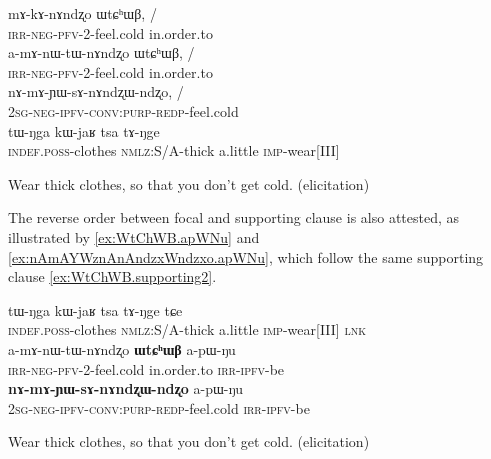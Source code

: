 \documentclass[oldfontcommands,oneside,a4paper,11pt]{article}
\newcommand{\ipa}[1]{{\phon \mbox{#1}}} %
\begin{document}
 \begin{exe}
\ex \label{ex:WtChWB}  \begin{xlist}
\ex
 \gll 
\ipa{mɤ-kɤ-nɤndʐo} 	\ipa{ɯtɕʰɯβ,} 	/\\
 \textsc{irr-neg-pfv}-2-feel.cold in.order.to\\
 \ex
 \gll 
\ipa{a-mɤ-nɯ-tɯ-nɤndʐo} 	\ipa{ɯtɕʰɯβ,} / \\
 \textsc{irr-neg-pfv}-2-feel.cold in.order.to\\
 \ex \label{ex:nAmAsAnAndzxWndzxo}  
 \gll 
 \ipa{nɤ-mɤ-ɲɯ-sɤ-nɤndʐɯ-ndʐo,} /\\
 \textsc{2sg-neg-ipfv-conv:purp-redp}-feel.cold\\
 \ex  \label{ex:WtChWB.supporting}  
 \gll 
 \ipa{tɯ-ŋga}    	\ipa{kɯ-jaʁ}    	\ipa{tsa}    	\ipa{tɤ-ŋge}  \\
 \textsc{indef.poss}-clothes \textsc{nmlz}:S/A-thick a.little \textsc{imp}-wear[III] \\
  \end{xlist}
 \glt Wear thick clothes, so that you don't get cold. (elicitation)
  \end{exe}
 
The reverse order  between focal and supporting clause is also attested,   as illustrated by \ref{ex:WtChWB.apWNu} and \ref{ex:nAmAYWznAnAndzxWndzxo.apWNu}, which follow the same   supporting clause \ref{ex:WtChWB.supporting2}.

\begin{exe}
\ex \begin{xlist}
 \ex \label{ex:WtChWB.supporting2}  
\gll 
 \ipa{tɯ-ŋga}    	\ipa{kɯ-jaʁ}    	\ipa{tsa}    	\ipa{tɤ-ŋge} \ipa{tɕe}\\
 \textsc{indef.poss}-clothes \textsc{nmlz}:S/A-thick a.little \textsc{imp}-wear[III]  \textsc{lnk}\\ 
 \ex \label{ex:WtChWB.apWNu}  
\gll 
 	\ipa{a-mɤ-nɯ-tɯ-nɤndʐo}    	\ipa{\textbf{ɯtɕʰɯβ}}    	\ipa{a-pɯ-ŋu}    	\\
  \textsc{irr-neg-pfv}-2-feel.cold in.order.to \textsc{irr-ipfv}-be \\
\ex \label{ex:nAmAYWznAnAndzxWndzxo.apWNu}
\gll
\ipa{\textbf{nɤ-mɤ-ɲɯ-sɤ-nɤndʐɯ-ndʐo}}    	\ipa{a-pɯ-ŋu}\\
 \textsc{2sg-neg-ipfv-conv:purp-redp}-feel.cold \textsc{irr-ipfv}-be\\
  \end{xlist}
\glt Wear thick clothes, so that you don't get cold. (elicitation)
 \end{exe}
\end{document}
